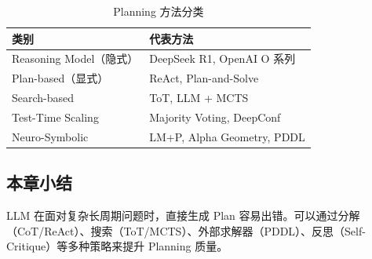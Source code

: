 \begin{table}[H]
\centering
\begin{tabular}{ll}
\toprule
\textbf{类别} & \textbf{代表方法} \\
\midrule
Reasoning Model（隐式） & DeepSeek R1, OpenAI O 系列 \\
Plan-based（显式） & ReAct, Plan-and-Solve \\
Search-based & ToT, LLM + MCTS \\
Test-Time Scaling & Majority Voting, DeepConf \\
Neuro-Symbolic & LM+P, Alpha Geometry, PDDL \\
\bottomrule
\end{tabular}
\caption{Planning 方法分类}
\end{table}

\subsection{本章小结}

LLM 在面对复杂长周期问题时，直接生成 Plan 容易出错。可以通过分解（CoT/ReAct）、搜索（ToT/MCTS）、外部求解器（PDDL）、反思（Self-Critique）等多种策略来提升 Planning 质量。


